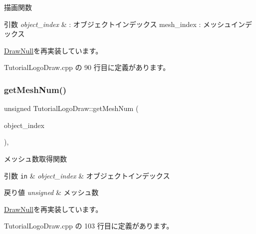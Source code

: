 描画関数 


\begin{DoxyParams}{引数}
{\em object\+\_\+index} & \+: オブジェクトインデックス mesh\+\_\+index \+: メッシュインデックス \\
\hline
\end{DoxyParams}


\mbox{\hyperlink{class_draw_null_a72ac0b7dc40b1469582419dcc5b0e114}{Draw\+Null}}を再実装しています。



 Tutorial\+Logo\+Draw.\+cpp の 90 行目に定義があります。

\mbox{\label{class_tutorial_logo_draw_a0e56784e25f1f83e6ff167280b801aad}} 
\subsubsection{\texorpdfstring{get\+Mesh\+Num()}{getMeshNum()}}
{\footnotesize\ttfamily unsigned Tutorial\+Logo\+Draw\+::get\+Mesh\+Num (\begin{DoxyParamCaption}\item[{unsigned}]{object\+\_\+index }\end{DoxyParamCaption})\hspace{0.3cm}{\ttfamily [override]}, {\ttfamily [virtual]}}



メッシュ数取得関数 


\begin{DoxyParams}[1]{引数}
\mbox{\tt in}  & {\em object\+\_\+index} & オブジェクトインデックス \\
\hline
\end{DoxyParams}

\begin{DoxyRetVals}{戻り値}
{\em unsigned} & メッシュ数 \\
\hline
\end{DoxyRetVals}


\mbox{\hyperlink{class_draw_null_a4c566a37d27fac3dcf76c7970443f375}{Draw\+Null}}を再実装しています。



 Tutorial\+Logo\+Draw.\+cpp の 103 行目に定義があります。

\mbox{\label{class_tutorial_logo_draw_abf06755b745dc62341a817a58d377659}} 
